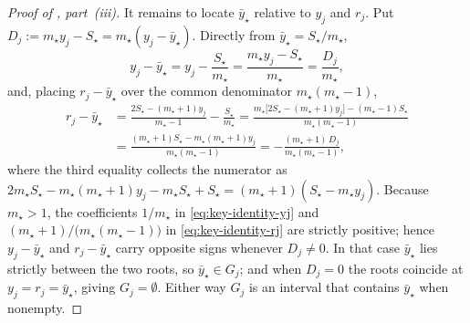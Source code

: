 \documentclass[twoside]{article}
\numberwithin{equation}{section}
\theoremstyle{plain}
\theoremstyle{definition}
\theoremstyle{remark}
\begin{document}
\begin{proof}[Proof of , part~(iii)]
It remains to locate $\bar{y}_\star$ relative to $y_j$ and $r_j$. Put
$D_j := m_\star y_j - S_\star = m_\star(y_j - \bar{y}_\star)$. Directly from
$\bar{y}_\star = S_\star/m_\star$,
\begin{equation}\label{eq:key-identity-yj}
  y_j - \bar{y}_\star
    = y_j - \frac{S_\star}{m_\star}
    = \frac{m_\star y_j - S_\star}{m_\star}
    = \frac{D_j}{m_\star},
\end{equation}
and, placing $r_j - \bar{y}_\star$ over the common denominator $m_\star(m_\star-1)$,
\begin{equation}\label{eq:key-identity-rj}
\begin{aligned}
  r_j - \bar{y}_\star
    &= \frac{2S_\star - (m_\star+1)y_j}{m_\star-1} - \frac{S_\star}{m_\star}
     = \frac{m_\star\bigl[2S_\star - (m_\star+1)y_j\bigr] - (m_\star-1)S_\star}
            {m_\star(m_\star-1)} \\[2pt]
    &= \frac{(m_\star+1)S_\star - m_\star(m_\star+1)y_j}{m_\star(m_\star-1)}
     = -\frac{(m_\star+1)\,D_j}{m_\star(m_\star-1)} ,
\end{aligned}
\end{equation}
where the third equality collects the numerator as
$2m_\star S_\star - m_\star(m_\star+1)y_j - m_\star S_\star + S_\star
 = (m_\star+1)(S_\star - m_\star y_j)$. Because $m_\star > 1$, the coefficients
$1/m_\star$ in \eqref{eq:key-identity-yj} and $(m_\star+1)/\bigl(m_\star(m_\star-1)\bigr)$
in \eqref{eq:key-identity-rj} are strictly positive; hence $y_j - \bar{y}_\star$ and
$r_j - \bar{y}_\star$ carry opposite signs whenever $D_j \neq 0$. In that case
$\bar{y}_\star$ lies strictly between the two roots, so $\bar{y}_\star \in G_j$; and when
$D_j = 0$ the roots coincide at $y_j = r_j = \bar{y}_\star$, giving $G_j = \emptyset$.
Either way $G_j$ is an interval that contains $\bar{y}_\star$ when nonempty.


\end{proof}
\end{document}
